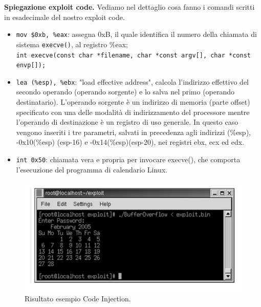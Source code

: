\textbf{Spiegazione exploit code.} Vediamo nel dettaglio cosa fanno i comandi scritti in esadecimale del nostro exploit code.
\begin{itemize}
    \item \verb|mov $0xb, %eax|: assegna 0xB, il quale identifica il numero della chiamata di sistema \verb|execve()|, al registro \%eax; \\
          \verb|int execve(const char *filename, char *const argv[], char *const envp[]);|
    \item \verb|lea (%esp), %ebx|: "load effective address", calcola l'indirizzo effettivo del secondo operando (operando sorgente) e lo salva nel primo (operando destinatario). L'operando sorgente è un indirizzo di memoria (parte offset) specificato con una delle modalità di indirizzamento del processore mentre l'operando di destinazione è un registro di uso generale. In questo caso vengono inseriti i tre parametri, salvati in precedenza agli indirizzi (\%esp), -0x10(\%esp) (esp-16) e -0x14(\%esp)(esp-20), nei registri ebx, ecx ed edx.
          \item\verb|int 0x50|: chiamata vera e propria  per invocare execve(), che comporta l'esecuzione del programma di calendario Linux.
\end{itemize}
\begin{figure}[H]
    \centering
    \includegraphics[width=12cm, keepaspectratio]{capitoli/secure_coding/img/cap_2/risultato_ex_pass_code_inj.png}
    \caption{Risultato esempio Code Injection.}\label{fig:ris_es_pass_ok_code_inj}
\end{figure}




